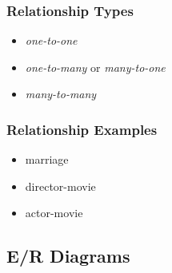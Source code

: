 \documentclass[dvipsnames]{beamer}
\begin{document}
\begin{frame}
  \frametitle{Relationship Types}

  \begin{itemize}
    \item \emph{one-to-one}
    \item \emph{one-to-many} or \emph{many-to-one}
    \item \emph{many-to-many}
  \end{itemize}
\end{frame}

\begin{frame}
  \frametitle{Relationship Examples}

  \begin{example}
    \begin{itemize}
      \item marriage
    \end{itemize}
  \end{example}

  \pause
  \begin{example}
    \begin{itemize}
      \item director-movie
    \end{itemize}
  \end{example}

  \pause
  \begin{example}
    \begin{itemize}
      \item actor-movie
    \end{itemize}
  \end{example}
\end{frame}

\subsection{E/R Diagrams}
\end{document}

